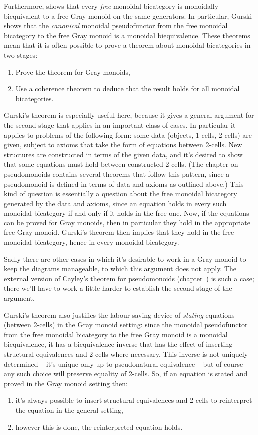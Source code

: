 \documentclass{robinthesisdraft}
\begin{document}
Furthermore, \citet{GurskiThesis} shows that every \emph{free} monoidal bicategory
is monoidally biequivalent to a free Gray monoid on the same generators.
In particular, Gurski shows that the \emph{canonical} monoidal pseudofunctor
from the free monoidal bicategory to the free Gray monoid is a monoidal
biequivalence.
%
These theorems mean that it is often possible to prove a theorem
about monoidal bicategories in two stages:
\begin{enumerate}
	\item Prove the theorem for Gray monoids,
	\item Use a coherence theorem to deduce that the result
		holds for all monoidal bicategories.
\end{enumerate}
%
Gurski's theorem is especially
useful here, because it gives a general argument for the second stage
that applies in an important class of cases. In particular it applies
to problems of the following form: some data (objects, 1-cells,
2-cells) are given, subject to axioms that take the form of
equations between 2-cells. New structures are constructed in terms
of the given data, and it's desired to show that some equations
must hold between constructed 2-cells. (The chapter on pseudomonoids
contains several theorems that follow this pattern, since a pseudomonoid
is defined in terms of data and axioms as outlined above.) This kind of
question is 
essentially a question about the free monoidal bicategory generated
by the data and axioms, since an equation holds in every such monoidal
bicategory if and only if it holds in the free one. Now, if the equations
can be proved for Gray monoids, then in particular they hold in the
appropriate free Gray monoid. Gurski's theorem then implies that they
hold in the free monoidal bicategory, hence in every monoidal bicategory.

Sadly there are other cases in which it's desirable to work in a Gray
monoid to keep the diagrams manageable, to which this argument does
not apply. The external version of Cayley's theorem for pseudomonoids
(chapter~\chCayley) is such a case; there we'll have to work a little harder
to establish the second stage of the argument.

Gurski's theorem also justifies the labour-saving device of \emph{stating}
equations (between 2-cells) in the Gray monoid setting: since the monoidal
pseudofunctor from the free monoidal bicategory to the free Gray monoid is
a monoidal biequivalence, it has a biequi\-valence-inverse that has the effect
of inserting structural equivalences and 2-cells where necessary. This
inverse is not uniquely determined -- it's unique only up to pseudonatural
equivalence -- but of course any such choice will preserve equality
of 2-cells. So, if an equation is stated and proved in the Gray monoid
setting then:
\begin{enumerate}
	\item it's always possible to insert structural equivalences and
		2-cells to reinterpret the equation in the general setting,
	\item however this is done, the reinterpreted equation holds.
\end{enumerate}
\end{document}
